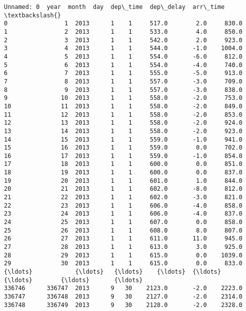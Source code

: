 \documentclass[11pt]{article}
\begin{document}
    \begin{Verbatim}[commandchars=\\\{\}]
        Unnamed: 0  year  month  day  dep\_time  dep\_delay  arr\_time  \textbackslash{}
0                1  2013      1    1     517.0        2.0     830.0   
1                2  2013      1    1     533.0        4.0     850.0   
2                3  2013      1    1     542.0        2.0     923.0   
3                4  2013      1    1     544.0       -1.0    1004.0   
4                5  2013      1    1     554.0       -6.0     812.0   
5                6  2013      1    1     554.0       -4.0     740.0   
6                7  2013      1    1     555.0       -5.0     913.0   
7                8  2013      1    1     557.0       -3.0     709.0   
8                9  2013      1    1     557.0       -3.0     838.0   
9               10  2013      1    1     558.0       -2.0     753.0   
10              11  2013      1    1     558.0       -2.0     849.0   
11              12  2013      1    1     558.0       -2.0     853.0   
12              13  2013      1    1     558.0       -2.0     924.0   
13              14  2013      1    1     558.0       -2.0     923.0   
14              15  2013      1    1     559.0       -1.0     941.0   
15              16  2013      1    1     559.0        0.0     702.0   
16              17  2013      1    1     559.0       -1.0     854.0   
17              18  2013      1    1     600.0        0.0     851.0   
18              19  2013      1    1     600.0        0.0     837.0   
19              20  2013      1    1     601.0        1.0     844.0   
20              21  2013      1    1     602.0       -8.0     812.0   
21              22  2013      1    1     602.0       -3.0     821.0   
22              23  2013      1    1     606.0       -4.0     858.0   
23              24  2013      1    1     606.0       -4.0     837.0   
24              25  2013      1    1     607.0        0.0     858.0   
25              26  2013      1    1     608.0        8.0     807.0   
26              27  2013      1    1     611.0       11.0     945.0   
27              28  2013      1    1     613.0        3.0     925.0   
28              29  2013      1    1     615.0        0.0    1039.0   
29              30  2013      1    1     615.0        0.0     833.0   
{\ldots}            {\ldots}   {\ldots}    {\ldots}  {\ldots}       {\ldots}        {\ldots}       {\ldots}   
336746      336747  2013      9   30    2123.0       -2.0    2223.0   
336747      336748  2013      9   30    2127.0       -2.0    2314.0   
336748      336749  2013      9   30    2128.0       -2.0    2328.0   

\end{Verbatim}
\end{document}
